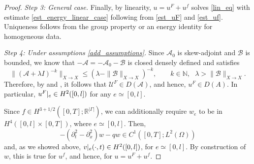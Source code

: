 \documentclass[11pt]{amsart}
\theoremstyle{definition}
\theoremstyle{plain}
\numberwithin{equation}{section}
\begin{document}
\begin{proof}
    \emph{Step 3: General case.}
    Finally, by linearity, $u=u^F+u^f$ solves \eqref{lin_eq} with estimate \eqref{est_energy_linear_case} following from \eqref{est_uF} and \eqref{est_uf}. Uniqueness follows from the group property or an energy identity for homogeneous data.

    \emph{Step 4: Under assumptions \eqref{add_assumptions}.} Since $\mathcal{A}_0$ is skew-adjoint and $\mathcal{B}$ is bounded, we know that $-\mathcal{A} = -\mathcal{A}_0 - \mathcal{B}$ is closed densely defined and satisfies
    \begin{equation*}
        \|(\mathcal{A} + \lambda I)^{-k}\|_{X\rightarrow X} \leq (\lambda - \|\mathcal{B}\|_{X\rightarrow X})^{-k},
        \qquad
        k\in \mathbb{N},
        \text{ }
        \lambda> \|\mathcal{B}\|_{X\rightarrow X}.
    \end{equation*}
    Therefore, by \cite[Theorem 1.19, IX, Ch. 5]{Kato1976} and \cite[(1.49), IX, Ch. 5]{Kato1976}, it follows that $\mathcal{U}^F \in D(\mathcal{A})$, and hence, $u^F\in D(A)$. In particular, $u^F\arrowvert_{e}\in H^2([0,l])$ for any $e\simeq [0,l]$. 

    Since $f \in H^{3 + 1/2}([0,T]; \mathbb{R}^{|\Gamma|})$, we can additionally require $w_e$ to be in $H^{4}([0,l]\times [0,T])$, where $e\simeq [0,l]$. Then,
    \begin{equation*}
        -(\partial_t^2-\partial_x^2)w - qw \in C^1([0,T]; L^2(\Omega))
    \end{equation*}
    and, as we showed above, $v\arrowvert_{e} (\cdot, t) \in H^2([0,l])$, for $e\simeq [0,l]$. By construction of $w$, this is true for $u^f$, and hence, for $u=u^F+u^f$.
\end{proof}
\end{document}
